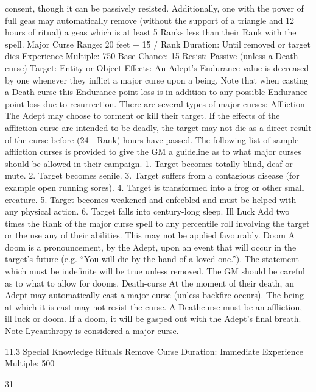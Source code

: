\documentclass[a4paper]{article}
\begin{document}
\begin{multicols}{3}
consent, though it can be passively resisted. Additionally, one with the power of full geas may
automatically remove (without the support of a
triangle and 12 hours of ritual) a geas which is at
least 5 Ranks less than their Rank with the spell.
Major Curse
Range: 20 feet + 15 / Rank
Duration: Until removed or target dies
Experience Multiple: 750
Base Chance: 15%
Resist: Passive (unless a Death-curse)
Target: Entity or Object
Effects: An Adept’s Endurance value is decreased
by one whenever they inflict a major curse upon a
being. Note that when casting a Death-curse this
Endurance point loss is in addition to any possible
Endurance point loss due to resurrection. There are
several types of major curses:
Affliction The Adept may choose to torment or kill
their target. If the effects of the affliction curse are
intended to be deadly, the target may not die as a
direct result of the curse before (24 - Rank) hours
have passed. The following list of sample affliction
curses is provided to give the GM a guideline as to
what major curses should be allowed in their campaign.
1. Target becomes totally blind, deaf or mute.
2. Target becomes senile.
3. Target suffers from a contagious disease (for
example open running sores).
4. Target is transformed into a frog or other small
creature.
5. Target becomes weakened and enfeebled and
must be helped with any physical action.
6. Target falls into century-long sleep.
Ill Luck Add two times the Rank of the major
curse spell to any percentile roll involving the
target or the use any of their abilities. This may not
be applied favourably.
Doom A doom is a pronouncement, by the Adept,
upon an event that will occur in the target’s future
(e.g. “You will die by the hand of a loved one.”).
The statement which must be indefinite will be true
unless removed. The GM should be careful as to
what to allow for dooms.
Death-curse At the moment of their death, an
Adept may automatically cast a major curse (unless
backfire occurs). The being at which it is cast may
not resist the curse. A Deathcurse must be an affliction, ill luck or doom. If a doom, it will be
gasped out with the Adept’s final breath.
Note Lycanthropy is considered a major curse.

11.3 Special Knowledge Rituals
Remove Curse
Duration: Immediate
Experience Multiple: 500

31


\end{multicols}
\end{document}
